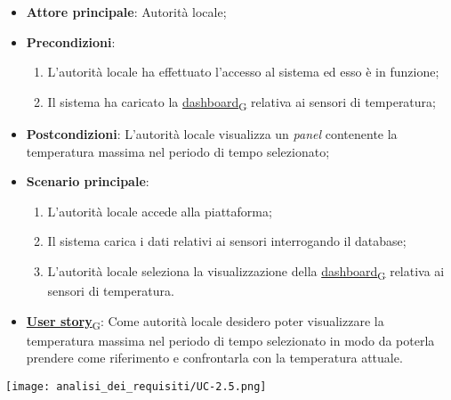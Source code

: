 \begin{itemize}
	\item \textbf{Attore principale}: Autorità locale;
	\item \textbf{Precondizioni}:
	      \begin{enumerate}
		      \item L'autorità locale ha effettuato l'accesso al sistema ed esso è in funzione;
		      \item Il sistema ha caricato la \href{https://7last.github.io/docs/rtb/documentazione-interna/glossario\#dashboard}{dashboard\textsubscript{G}} relativa ai sensori di temperatura;
	      \end{enumerate}
	\item \textbf{Postcondizioni}: L'autorità locale visualizza un \textit{panel} contenente la temperatura massima nel periodo di tempo selezionato;
	\item \textbf{Scenario principale}:
	      \begin{enumerate}
		      \item L'autorità locale accede alla piattaforma;
		      \item Il sistema carica i dati relativi ai sensori interrogando il database;
		      \item L'autorità locale seleziona la visualizzazione della \href{https://7last.github.io/docs/rtb/documentazione-interna/glossario\#dashboard}{dashboard\textsubscript{G}} relativa ai sensori di temperatura.
	      \end{enumerate}
	\item \href{https://7last.github.io/docs/rtb/documentazione-interna/glossario\#user-story}{\textbf{User story}\textsubscript{G}}:
	      Come autorità locale desidero poter visualizzare la temperatura massima nel periodo di tempo selezionato
	      in modo da poterla prendere come riferimento e confrontarla con la temperatura attuale.
\end{itemize}
\begin{center}
	\texttt{[image: analisi\_dei\_requisiti/UC-2.5.png]}
\end{center}

